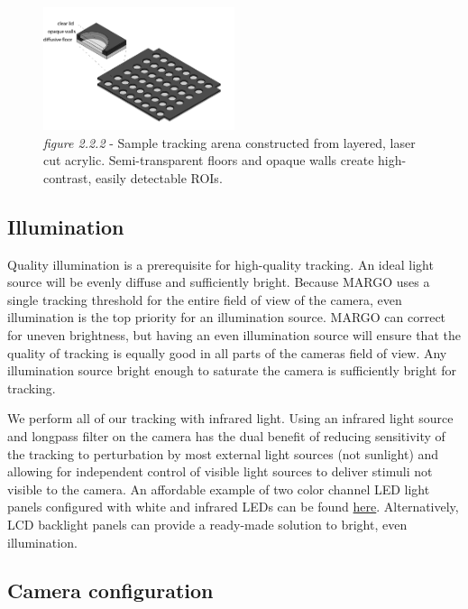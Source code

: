 \documentclass[11pt]{article}
\begin{document}
\begin{figure}[h!]
	\begin{center}
		\includegraphics[width=0.5\textwidth]{images/Hardware Setup/Behavioral Arenas/circular_arenas.pdf}
		\caption*{\footnotesize {\textit{figure 2.2.2} - Sample tracking arena constructed from layered, laser cut acrylic. Semi-transparent floors and opaque walls create high-contrast, easily detectable ROIs.}}
	\end{center}
\end{figure}

\hypertarget{illumsection}{\subsection{Illumination}}

Quality illumination is a prerequisite for high-quality tracking. An ideal light source will be evenly diffuse and sufficiently bright. Because MARGO uses a single tracking threshold for the entire field of view of the camera, even illumination is the top priority for an illumination source. MARGO can correct for uneven brightness, but having an even illumination source will ensure that the quality of tracking is equally good in all parts of the cameras field of view. Any illumination source bright enough to saturate the camera is sufficiently bright for tracking.

We perform all of our tracking with infrared light. Using an infrared light source and longpass filter on the camera has the dual benefit of reducing sensitivity of the tracking to perturbation by most external light sources (not sunlight) and allowing for independent control of visible light sources to deliver stimuli not visible to the camera. An affordable example of two color channel LED light panels configured with white and infrared LEDs can be found \href{https://www.knema.com/led-modules.html}{here}. Alternatively, LCD backlight panels can provide a ready-made solution to bright, even illumination.

\hypertarget{camconfig}{\subsection{Camera configuration}}
\end{document}
